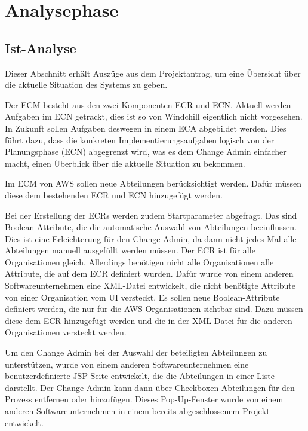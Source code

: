 \section{Analysephase} 
\label{sec:Analysephase}


\subsection{Ist-Analyse} 
\label{sec:IstAnalyse}
Dieser Abschnitt erhält Auszüge aus dem Projektantrag, um eine Übersicht über die aktuelle Situation des Systems zu geben.

Der \ac{ECM} besteht aus den zwei Komponenten \ac{ECR} und \ac{ECN}.
Aktuell werden Aufgaben im \ac{ECN} getrackt, dies ist so von Windchill eigentlich nicht vorgesehen.
In Zukunft sollen Aufgaben deswegen in einem \ac{ECA} abgebildet werden.
Dies führt dazu, dass die konkreten Implementierungsaufgaben logisch von der Planungsphase (ECN) abgegrenzt wird, was es dem Change Admin einfacher macht, einen Überblick über die aktuelle Situation zu bekommen.

Im \ac{ECM} von \ac{AWS} sollen neue Abteilungen berücksichtigt werden.
Dafür müssen diese dem bestehenden \ac{ECR} und \ac{ECN} hinzugefügt werden.

Bei der Erstellung der \acsp{ECR} werden zudem Startparameter abgefragt.
Das sind Boolean-Attribute, die die automatische Auswahl von Abteilungen beeinflussen.
Dies ist eine Erleichterung für den Change Admin, da dann nicht jedes Mal alle Abteilungen manuell ausgefüllt werden müssen.
Der \ac{ECR} ist für alle Organisationen gleich.
Allerdings benötigen nicht alle Organisationen alle Attribute, die auf dem \ac{ECR} definiert wurden.
Dafür wurde von einem anderen Softwareunternehmen eine XML-Datei entwickelt, die nicht benötigte Attribute von einer Organisation vom UI versteckt.
Es sollen neue Boolean-Attribute definiert werden, die nur für die \ac{AWS} Organisationen sichtbar sind.
Dazu müssen diese dem \ac{ECR} hinzugefügt werden und die in der XML-Datei für die anderen Organisationen versteckt werden.

Um den Change Admin bei der Auswahl der beteiligten Abteilungen zu unterstützen, wurde von einem anderen Softwareunternehmen eine benutzerdefinierte JSP Seite entwickelt, die die Abteilungen in einer Liste darstellt.
Der Change Admin kann dann über Checkboxen Abteilungen für den Prozess entfernen oder hinzufügen.
Dieses Pop-Up-Fenster wurde von einem anderen Softwareunternehmen in einem bereits abgeschlossenem Projekt entwickelt.


